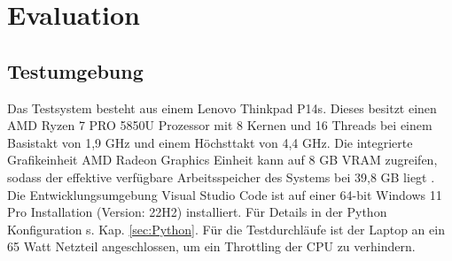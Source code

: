 \chapter{Evaluation}
\label{ch:Evaluation}
\section{Testumgebung}{ \label{sec:testumgebung}
Das Testsystem besteht aus einem Lenovo Thinkpad P14s. Dieses besitzt einen AMD Ryzen 7 PRO 5850U Prozessor mit 8 Kernen und 16 Threads bei einem Basistakt von 1,9 GHz und einem Höchsttakt von 4,4 GHz. Die integrierte Grafikeinheit AMD Radeon Graphics Einheit kann auf 8 GB VRAM zugreifen, sodass der effektive verfügbare Arbeitsspeicher des Systems bei 39,8 GB liegt \citep{PSREF21}. Die Entwicklungsumgebung \glqq Visual Studio Code\grqq{} ist auf einer 64-bit Windows 11 Pro Installation (Version: 22H2) installiert. Für Details in der Python Konfiguration s. Kap. \ref{sec:Python}. Für die Testdurchläufe ist der Laptop an ein 65 Watt Netzteil angeschlossen, um ein Throttling der CPU zu verhindern.}


